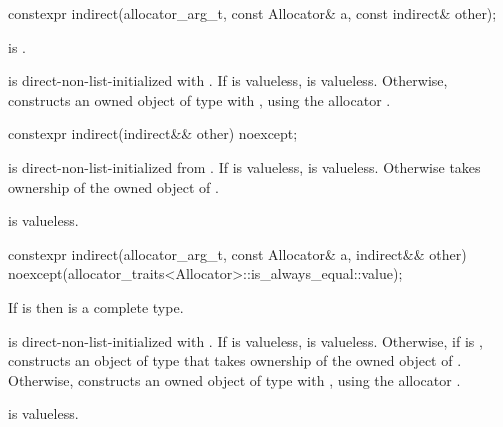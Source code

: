 %
\begin{itemdecl}
constexpr indirect(allocator_arg_t, const Allocator& a, const indirect& other);
\end{itemdecl}

\begin{itemdescr}
\pnum
\mandates
{} is .

\pnum
\effects
{} is direct-non-list-initialized with .
If  is valueless,  is valueless.
Otherwise,
constructs an owned object of type  with ,
using the allocator .
\end{itemdescr}

%
\begin{itemdecl}
constexpr indirect(indirect&& other) noexcept;
\end{itemdecl}

\begin{itemdescr}
\pnum
\effects
{} is direct-non-list-initialized from
.
If  is valueless,  is valueless.
Otherwise  takes ownership of the owned object of .

\pnum
\ensures
{} is valueless.
\end{itemdescr}

%
\begin{itemdecl}
constexpr indirect(allocator_arg_t, const Allocator& a, indirect&& other)
  noexcept(allocator_traits<Allocator>::is_always_equal::value);
\end{itemdecl}

\begin{itemdescr}
\pnum
\mandates
If  is 
then  is a complete type.

\pnum
\effects
{} is direct-non-list-initialized with .
If  is valueless,  is valueless.
Otherwise,
if  is ,
constructs an object of type  that
takes ownership of the owned object of .
Otherwise,
constructs an owned object of type  with ,
using the allocator .

\pnum
\ensures
{} is valueless.
\end{itemdescr}

